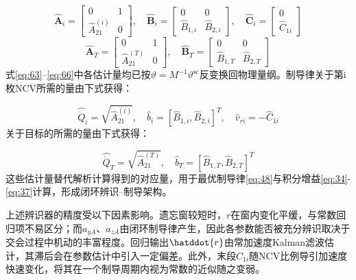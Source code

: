 \begin{equation}
\label{eq:63}
\hat{\mathbf{A}}_{i} = \left[ {\begin{array}{*{20}{c}}
  0&1 \\ 
  {\hat A_{21}^{(i)}}&0 
\end{array}} \right],\quad \hat{\mathbf{B}}_{i} = \left[ {\begin{array}{*{20}{c}}
  0&0 \\ 
  {{{\hat B}_{1,i}}}&{{{\hat B}_{2,i}}} 
\end{array}} \right],\quad \hat{\mathbf{C}}_{i} = \left[ {\begin{array}{*{20}{c}}
  0 \\ 
  {{{\hat C}_{1i}}} 
\end{array}} \right]
\end{equation}
\begin{equation}
\label{eq:64}
\hat{\mathbf{A}}_{T} = \left[ {\begin{array}{*{20}{c}}
  0&1 \\ 
  {\hat A_{21}^{(T)}}&0 
\end{array}} \right],\quad \hat{\mathbf{B}}_{T} = \left[ {\begin{array}{*{20}{c}}
  0&0 \\ 
  {{{\hat B}_{1,T}}}&{{{\hat B}_{2,T}}} 
\end{array}} \right]
\end{equation}
式\eqref{eq:63}--\eqref{eq:66}中各估计量均已按$\vartheta  = {M^{ - 1}}{\vartheta ^{{\text{sc}}}}$反变换回物理量纲。制导律关于第i枚NCV所需的量由下式获得：

\begin{equation}
\label{eq:65}
\hat{\dot Q}_{i} = \sqrt {\hat A_{21}^{(i)}} ,\quad \hat{b}_{i} = {\left[ {{{\hat B}_{1,i}},{{\hat B}_{2,i}}} \right]^T},\quad \hat{v}_{ri} =  - \hat{C}_{1i}
\end{equation}
关于目标的所需的量由下式获得：

\begin{equation}
\label{eq:66}
\hat{\dot Q}_{T} = \sqrt {\hat A_{21}^{(T)}} ,\quad \hat{b}_{T} = {\left[ {{{\hat B}_{1,T}},{{\hat B}_{2,T}}} \right]^T}
\end{equation}
这些估计量替代解析计算得到的对应量，用于最优制导律\eqref{eq:48}与积分增益\eqref{eq:34}-\eqref{eq:37}计算，形成闭环辨识–制导架构。
\begin{remark}
上述辨识器的精度受以下因素影响。遗忘窗较短时，${r}$在窗内变化平缓，与常数回归项不易区分；而${a_{yA}}$、${a_{zA}}$由闭环制导律产生，因此各参数能否被充分辨识取决于交会过程中机动的丰富程度。回归输出$\hatddot{r}$由常加速度Kalman滤波估计，其滞后会在参数估计中引入一定偏差。此外，末段${C_{1i}}$随NCV比例导引加速度快速变化，将其在一个制导周期内视为常数的近似随之变弱。
\end{remark}

